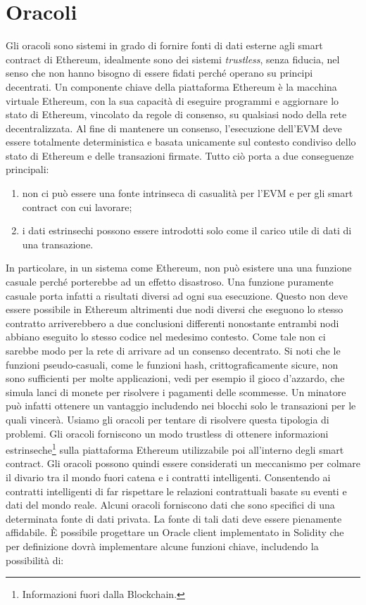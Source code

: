 \section{Oracoli}
\label{ethereum-oracoli}
Gli oracoli sono sistemi in grado di fornire fonti di dati esterne agli smart contract di Ethereum, idealmente sono dei sistemi \textit{trustless}, senza fiducia, nel senso che non hanno bisogno di essere fidati perché operano su principi decentrati. Un componente chiave della piattaforma Ethereum è la macchina virtuale Ethereum, con la sua capacità di eseguire programmi e aggiornare lo stato di Ethereum, vincolato da regole di consenso, su qualsiasi nodo della rete decentralizzata. Al fine di mantenere un consenso, l'esecuzione dell'EVM deve essere totalmente deterministica e basata unicamente sul contesto condiviso dello stato di Ethereum e delle transazioni firmate. Tutto ciò porta a due conseguenze principali:
\begin{enumerate}
	\item non ci può essere una fonte intrinseca di casualità per l'EVM e per gli smart contract con cui lavorare;
	\item i dati estrinsechi possono essere introdotti solo come il carico utile di dati di una transazione.
\end{enumerate}
In particolare, in un sistema come Ethereum, non può esistere una una funzione casuale perché porterebbe ad un effetto disastroso. Una funzione puramente casuale porta infatti a risultati diversi ad ogni sua esecuzione. Questo non deve essere possibile in Ethereum altrimenti due nodi diversi che eseguono lo stesso contratto arriverebbero a due conclusioni differenti nonostante entrambi nodi abbiano eseguito lo stesso codice nel medesimo contesto. Come tale non ci sarebbe modo per la rete di arrivare ad un consenso decentrato. Si noti che le funzioni pseudo-casuali, come le funzioni hash, crittograficamente sicure, non sono sufficienti per molte applicazioni, vedi per esempio il gioco d'azzardo, che simula lanci di monete per risolvere i pagamenti delle scommesse. Un minatore può infatti ottenere un vantaggio includendo nei blocchi solo le transazioni per le quali vincerà. Usiamo gli oracoli per tentare di risolvere questa tipologia di problemi. Gli oracoli forniscono un modo trustless di ottenere informazioni estrinseche\footnote{Informazioni fuori dalla Blockchain.} sulla piattaforma Ethereum utilizzabile poi all'interno degli smart contract. Gli oracoli possono quindi essere considerati un meccanismo per colmare il divario tra il mondo fuori catena e i contratti intelligenti. Consentendo ai contratti intelligenti di far rispettare le relazioni contrattuali basate su eventi e dati del mondo reale. Alcuni oracoli forniscono dati che sono specifici di una determinata fonte di dati privata. La fonte di tali dati deve essere pienamente affidabile. \`E possibile progettare un Oracle client implementato in Solidity che per definizione dovrà implementare alcune funzioni chiave, includendo la possibilità di:
